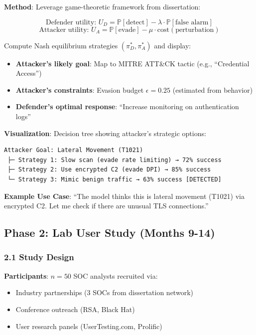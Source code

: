\documentclass[11pt]{article}
\begin{document}
\textbf{Method}: Leverage game-theoretic framework from dissertation:

\begin{equation}
\text{Defender utility: } U_D = \mathbb{P}[\text{detect}] - \lambda \cdot \mathbb{P}[\text{false alarm}]
\end{equation}
\begin{equation}
\text{Attacker utility: } U_A = \mathbb{P}[\text{evade}] - \mu \cdot \text{cost}(\text{perturbation})
\end{equation}

Compute Nash equilibrium strategies $(\pi_D^*, \pi_A^*)$ and display:
\begin{itemize}
    \item \textbf{Attacker's likely goal}: Map to MITRE ATT\&CK tactic (e.g., ``Credential Access'')
    \item \textbf{Attacker's constraints}: Evasion budget $\epsilon = 0.25$ (estimated from behavior)
    \item \textbf{Defender's optimal response}: ``Increase monitoring on authentication logs''
\end{itemize}

\textbf{Visualization}: Decision tree showing attacker's strategic options:
\begin{verbatim}
Attacker Goal: Lateral Movement (T1021)
 ├─ Strategy 1: Slow scan (evade rate limiting) → 72% success
 ├─ Strategy 2: Use encrypted C2 (evade DPI) → 85% success
 └─ Strategy 3: Mimic benign traffic → 63% success [DETECTED]
\end{verbatim}

\textbf{Example Use Case}: ``The model thinks this is lateral movement (T1021) via encrypted C2. Let me check if there are unusual TLS connections.''

\subsection{Phase 2: Lab User Study (Months 9-14)}

\subsubsection{2.1 Study Design}

\textbf{Participants}: $n = 50$ SOC analysts recruited via:
\begin{itemize}
    \item Industry partnerships (3 SOCs from dissertation network)
    \item Conference outreach (RSA, Black Hat)
    \item User research panels (UserTesting.com, Prolific)
\end{itemize}
\end{document}

